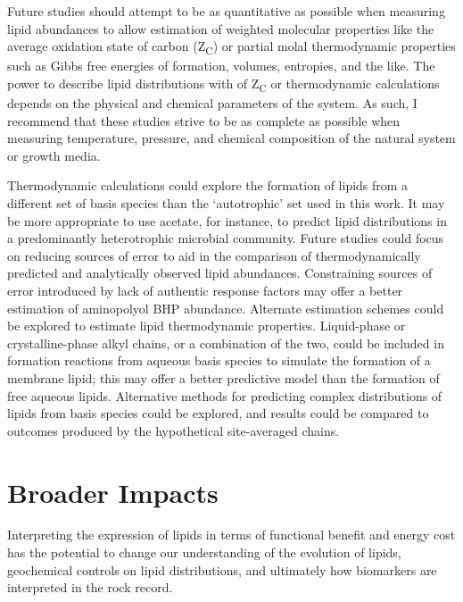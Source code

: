 Future studies should attempt to be as quantitative as possible when measuring lipid abundances to allow estimation of weighted molecular properties like the average oxidation state of carbon (Z\textsubscript{C}) or partial molal thermodynamic properties such as Gibbs free energies of formation, volumes, entropies, and the like. The power to describe lipid distributions with of Z\textsubscript{C} or thermodynamic calculations depends on the physical and chemical parameters of the system. As such, I recommend that these studies strive to be as complete as possible when measuring temperature, pressure, and chemical composition of the natural system or growth media.

Thermodynamic calculations could explore the formation of lipids from a different set of basis species than the `autotrophic' set used in this work. It may be more appropriate to use acetate, for instance, to predict lipid distributions in a predominantly heterotrophic microbial community. Future studies could focus on reducing sources of error to aid in the comparison of thermodynamically predicted and analytically observed lipid abundances. Constraining sources of error introduced by lack of authentic response factors may offer a better estimation of aminopolyol BHP abundance. Alternate estimation schemes could be explored to estimate lipid thermodynamic properties. Liquid-phase or crystalline-phase alkyl chains, or a combination of the two, could be included in formation reactions from aqueous basis species to simulate the formation of a membrane lipid; this may offer a better predictive model than the formation of free aqueous lipids. Alternative methods for predicting complex distributions of lipids from basis species could be explored, and results could be compared to outcomes produced by the hypothetical site-averaged chains.


\section{Broader Impacts}

Interpreting the expression of lipids in terms of functional benefit and energy cost has the potential to change our understanding of the evolution of lipids, geochemical controls on lipid distributions, and ultimately how biomarkers are interpreted in the rock record.

